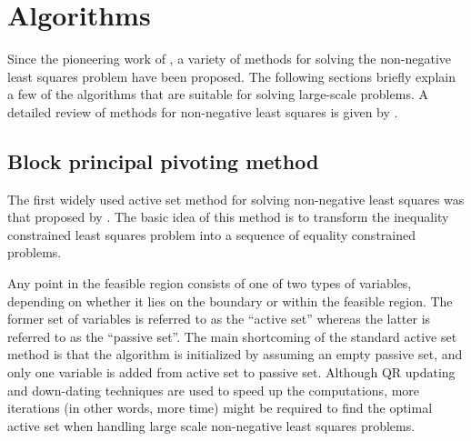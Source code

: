 \documentclass[11pt]{article}
\newcommand{\0}{\phantom{0}}
\begin{document}
\section{Algorithms}\label{sec:quadalgo}

Since the pioneering work of \citet{Lawson1974}, a variety of methods for solving the non-negative least squares problem have been proposed. The following sections briefly explain a few of the algorithms that are suitable for solving large-scale problems. A detailed review of methods for non-negative least squares is given by \citet{Chen2009}.

\subsection{Block principal pivoting method}

The first widely used active set method for solving non-negative least squares was that proposed by \citet{Lawson1974}. The basic idea of this method is to transform the inequality constrained least squares problem into a sequence of equality constrained problems.

Any point in the feasible region consists of one of two types of variables, depending on whether it lies on the boundary or within the feasible region. The former set of variables is referred to as the ``active set'' whereas the latter is referred to as the ``passive set''. The main shortcoming of the standard active set method is that the algorithm is initialized by assuming an empty passive set, and only one variable is added from active set to passive set. Although QR updating and down-dating techniques are used to speed up the computations, more iterations (in other words, more time) might be required to find the optimal active set when handling large scale non-negative least squares problems. 

\end{document}
